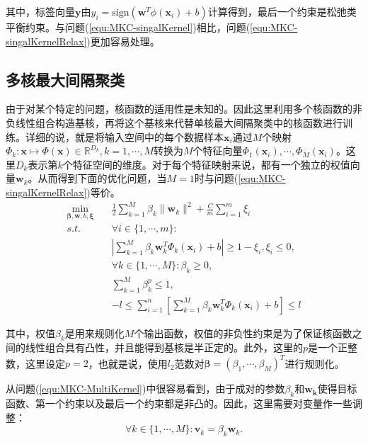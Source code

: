 其中，标签向量$\mathbf{y}$由$y_i=\mathrm{sign}(\mathbf{w}^T\phi(\mathbf{x}_i)+b)$计算得到，最后一个约束是松弛类平衡约束。与问题(\ref{equ:MKC-singalKernel})相比，问题(\ref{equ:MKC-singalKernelRelax})更加容易处理。

\subsection{多核最大间隔聚类}
由于对某个特定的问题，核函数的适用性是未知的。因此这里利用多个核函数的非负线性组合构造基核，再将这个基核来代替单核最大间隔聚类中的核函数进行训练。详细的说，就是将输入空间中的每个数据样本$\mathbf{x}_i$通过$M$个映射$\Phi_k:\mathbf{x}\mapsto \Phi(\mathbf{x})\in \mathbb{R}^{D_k},k=1,\cdots,M$转换为$M$个特征向量$\Phi_1(\mathbf{x}_i),\cdots,\Phi_M(\mathbf{x}_i)$。这里$D_k$表示第$k$个特征空间的维度。对于每个特征映射来说，都有一个独立的权值向量$\mathbf{w}_k$。从而得到下面的优化问题，当$M=1$时与问题(\ref{equ:MKC-singalKernelRelax})等价。
\begin{equation}
\begin{split}
\min_{\mathbf{\beta},\mathbf{w},b,\mathbf{\xi}} \quad & \frac{1}{2}\sum^M_{k=1}\beta_k\|\mathbf{w}_k\|^2+\frac{C}{m}\sum^m_{i=1}\xi_i \\
s.t. \quad & \forall i \in \{1,\cdots,m\}:  \\
& \left |\sum^M_{k=1}\beta_k\mathbf{w}_k^T\Phi_k(\mathbf{x}_i)+b\right | \ge 1-\xi_i,\xi_i \le 0,   \\
& \forall k \in \{1,\cdots,M\}:\beta_k \ge 0,   \\
& \sum^M_{k=1}\beta_k^p \le 1,   \\
& -l \le \sum^n_{i=1}\left[\sum^M_{k=1}\beta_k\mathbf{w}_k^T\Phi_k(\mathbf{x}_i)+b\right] \le l 
\label{equ:MKC-MultiKernel}
\end{split}
\end{equation}

其中，权值$\beta_k$是用来规则化$M$个输出函数，权值的非负性约束是为了保证核函数之间的线性组合具有凸性，并且能得到基核是半正定的。此外，这里的$p$是一个正整数，这里设定$p=2$，也就是说，使用$l_2$范数对$\mathbf{\beta}=(\beta_1,\cdots,\beta_M)^T$进行规则化。

从问题(\ref{equ:MKC-MultiKernel})中很容易看到，由于成对的参数$\beta_k$和$\mathbf{w_k}$使得目标函数、第一个约束以及最后一个约束都是非凸的。因此，这里需要对变量作一些调整：
\begin{equation}
\forall k\in\{1,\cdots,M\}:\mathbf{v}_k=\beta_k\mathbf{w}_k. 
\end{equation}

